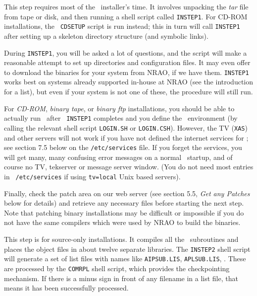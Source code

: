 \medskip{}


This step requires most of the \AIPS\ installer's time.  It involves
unpacking the {\it tar\/} file from tape or disk, and then running a
shell script called {\tt INSTEP1}.  For CD-ROM installations, the {\tt
CDSETUP} script is run instead; this in turn will call {\tt INSTEP1}
after setting up a skeleton directory structure (and symbolic links).

During {\tt INSTEP1}, you will be asked a lot of questions, and the
script will make a reasonable attempt to set up directories and
configuration files.  It may even offer to download the binaries for
your system from NRAO, if we have them.  {\tt INSTEP1} works best on
systems already supported in-house at NRAO (see the introduction for a
list), but even if your system is not one of these, the procedure will
still run.

For {\it CD-ROM\/}, {\it binary tape\/}, or {\it binary ftp\/}
installations, you should be able to actually run \AIPS\ after {\tt
INSTEP1} completes and you define the \AIPS\ environment (by calling the
relevant shell script {\tt LOGIN.SH} or {\tt LOGIN.CSH}).  However, the
TV ({\tt XAS}) and other servers will not work if you have not defined
the internet services for
\AIPS; see section 7.5 below on the {\tt /etc/services} file.
If you forget the services, you will get many, many confusing error
messages on a normal \ttaips\ startup, and of course no TV, tekserver or
message server window.  (You do not need most entries in {\tt
/etc/services} if using {\tt tv=local} Unix based servers).

Finally, check the patch area on our web server (see section 5.5,
{\it Get any Patches\/} below for details) and retrieve any necessary
files before starting the next step.  Note that patching binary
installations may be difficult or impossible if you do not have the same
compilers which were used by NRAO to build the binaries.

\medskip{}

This step is for source-only installations.  It compiles all the
\AIPS\ subroutines and places the object files in about twelve separate
libraries.  The {\tt INSTEP2} shell script will generate a set of list
files with names like {\tt AIPSUB.LIS}, {\tt APLSUB.LIS}, \etc.  These
are processed by the {\tt COMRPL} shell script, which provides the
checkpointing mechanism.  If there is a minus sign in front of any
filename in a list file, that means it has been successfully processed.

